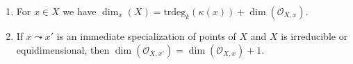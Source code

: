 \begin{lemma}
\begin{enumerate}
\begin{enumerate}
\item any maximal chain of nontrivial specializations
$x = x_0 \leadsto x_1 \leadsto \ldots \leadsto x_n = x'$ has
length $n = \text{trdeg}_k(\kappa(x)) - \text{trdeg}_k(\kappa(x'))$.
\end{enumerate}
\item
\label{item-dimension-formula}
For $x \in X$ we have
$\dim_x(X) = \text{trdeg}_k(\kappa(x)) + \dim(\mathcal{O}_{X, x})$.
\item
\label{item-immediate-specialization-local-ring}
If $x \leadsto x'$ is an immediate specialization
of points of $X$ and $X$ is irreducible or equidimensional, then
$\dim(\mathcal{O}_{X, x'}) = \dim(\mathcal{O}_{X, x}) + 1$.
\end{enumerate}
\end{lemma}

